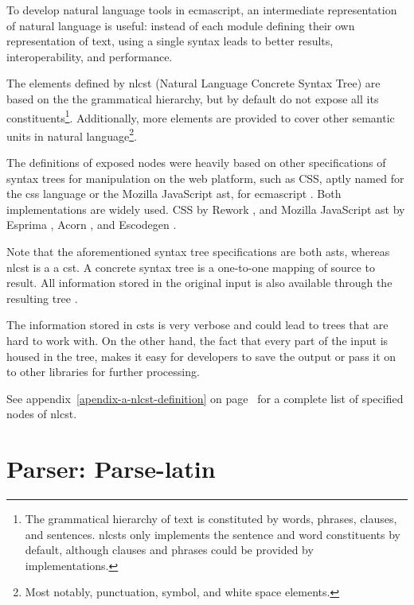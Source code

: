 To develop natural language tools in \gls{ecmascript}, an intermediate
representation of natural language is useful: instead of each module
defining their own representation of text, using a single syntax leads
to better results, interoperability, and performance.

The elements defined by \gls{nlcst} (Natural Language Concrete Syntax
Tree) are based on the the grammatical hierarchy, but by default do not
expose all its constituents\footnote{The grammatical hierarchy of text
  is constituted by words, phrases, clauses, and sentences.
  \glspl{nlcst} only implements the sentence and word constituents by
  default, although clauses and phrases could be provided by
  implementations.}. Additionally, more elements are provided to cover
other semantic units in natural language\footnote{Most notably,
  punctuation, symbol, and white space elements.}.

The definitions of exposed nodes were heavily based on other
specifications of syntax trees for manipulation on the web platform,
such as CSS, aptly named for the \acrshort{css} language
\autocite{reworkcss/css-source-code} or the Mozilla JavaScript
\acrshort{ast}, for \gls{ecmascript}
\autocite{mozilla.org-spidermonkey-parser_api}. Both implementations are
widely used. CSS by Rework \autocite{reworkcss/rework-source-code}, and
Mozilla JavaScript \gls{ast} by Esprima
\autocite{ariya/esprima-source-code}, Acorn
\autocite{marijnh/acorn-source-code}, and Escodegen
\autocite{constellation/escodegen-source-code}.

Note that the aforementioned syntax tree specifications are both
\glspl{ast}, whereas \gls{nlcst} is a a \gls{cst}. A concrete syntax
tree is a one-to-one mapping of source to result. All information stored
in the original input is also available through the resulting tree
\autocite{thegreenplace.net-abstract-concrete-syntax-trees}.

The information stored in \glspl{cst} is very verbose and could lead to
trees that are hard to work with. On the other hand, the fact that every
part of the input is housed in the tree, makes it easy for developers to
save the output or pass it on to other libraries for further processing.

\medskip \noindent See appendix~\ref{apendix-a-nlcst-definition} on
page~\pageref{apendix-a-nlcst-definition} for a complete list of
specified nodes of \gls{nlcst}.

\section{Parser: Parse-latin}\label{parser-parse-latin}

